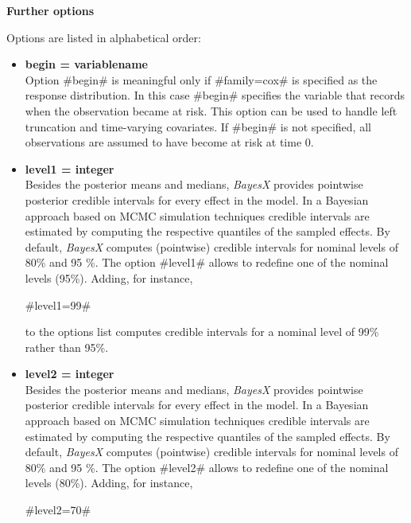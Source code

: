 {\bf Further options} \label{further options}

Options are listed in alphabetical order:

  
\begin{itemize}
\item {\bf begin = variablename} \\
Option #begin# is meaningful only if #family=cox# is specified as
the response distribution. In this case #begin# specifies the
variable that records when the observation became at risk. This
option can be used to handle left truncation and time-varying
covariates. If #begin# is not specified, all observations are
assumed to have become at risk at time 0.
\item \label{level1} {\bf level1 = integer} \\
Besides the posterior means and medians, {\em BayesX} provides
pointwise posterior credible intervals for every effect in the
model. In a Bayesian approach based on MCMC simulation techniques
credible intervals are estimated by computing the respective
quantiles of the sampled effects. By default, {\em BayesX}
computes (pointwise) credible intervals for nominal levels of 80\%
and 95 \%. The option #level1# allows to redefine one of the
nominal levels (95\%). Adding, for instance,

#level1=99#

to the options list computes credible intervals for a nominal
level of 99\% rather than 95\%.
\item \label{level2} {\bf level2 = integer} \\
Besides the posterior means and medians, {\em BayesX} provides
pointwise posterior credible intervals for every effect in the
model. In a Bayesian approach based on MCMC simulation techniques
credible intervals are estimated by computing the respective
quantiles of the sampled effects. By default, {\em BayesX}
computes (pointwise) credible intervals for nominal levels of 80\%
and 95 \%. The option #level2# allows to redefine one of the
nominal levels (80\%). Adding, for instance,

#level2=70#


\end{itemize}
